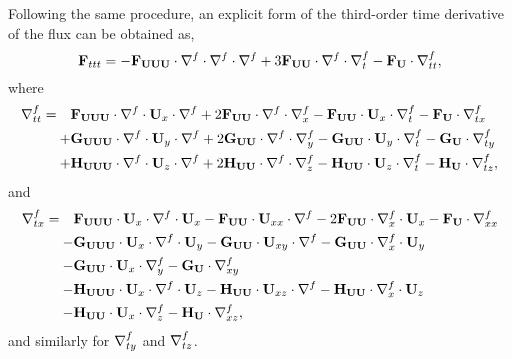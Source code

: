 Following the same procedure,
an explicit form of the third-order time derivative of the flux
can be obtained as,
\begin{equation}\label{eq:pif_Fttt}
    \bF_{ttt} = -\bF_{\bU \bU \bU} \cdot \Div \cdot \Div \cdot \Div
    + 3 \bF_{\bU \bU} \cdot \Div \cdot \Div_{t}
    - \bF_{\bU} \cdot \Div_{tt},
\end{equation}
where
\begin{equation}\label{eq:pif_divtt}
    \begin{split}
        \Div_{tt} = \quad & \bF_{\bU \bU \bU} \cdot \Div \cdot \bU_{x} \cdot \Div + 2 \bF_{\bU \bU} \cdot \Div \cdot \Div_{x} - \bF_{\bU \bU} \cdot \bU_{x} \cdot \Div_{t} - \bF_{\bU} \cdot \Div_{tx} \\
            + & \bG_{\bU \bU \bU} \cdot \Div \cdot \bU_{y} \cdot \Div + 2 \bG_{\bU \bU} \cdot \Div \cdot \Div_{y} - \bG_{\bU \bU} \cdot \bU_{y} \cdot \Div_{t} - \bG_{\bU} \cdot \Div_{ty} \\
            + & \bH_{\bU \bU \bU} \cdot \Div \cdot \bU_{z} \cdot \Div + 2 \bH_{\bU \bU} \cdot \Div \cdot \Div_{z} - \bH_{\bU \bU} \cdot \bU_{z} \cdot \Div_{t} - \bH_{\bU} \cdot \Div_{tz},
    \end{split}
\end{equation}
and
\begin{equation}\label{eq:pif_divtx}
    \begin{split}
        \Div_{tx} = \quad & \bF_{\bU \bU \bU} \cdot \bU_{x} \cdot \Div \cdot \bU_{x} - \bF_{\bU \bU} \cdot \bU_{xx} \cdot \Div
        -2\bF_{\bU \bU} \cdot \Div_{x} \cdot \bU_{x} - \bF_{\bU} \cdot \Div_{xx} \\
            - & \bG_{\bU \bU \bU} \cdot \bU_{x} \cdot \Div \cdot \bU_{y} - \bG_{\bU \bU} \cdot \bU_{xy} \cdot \Div - \bG_{\bU \bU} \cdot \Div_{x} \cdot \bU_{y} \\
            - & \bG_{\bU \bU} \cdot \bU_{x} \cdot \Div_{y} - \bG_{\bU} \cdot \Div_{xy} \\
            - & \bH_{\bU \bU \bU} \cdot \bU_{x} \cdot \Div \cdot \bU_{z} - \bH_{\bU \bU} \cdot \bU_{xz} \cdot \Div - \bH_{\bU \bU} \cdot \Div_{x} \cdot \bU_{z} \\
            - & \bH_{\bU \bU} \cdot \bU_{x} \cdot \Div_{z} - \bH_{\bU} \cdot \Div_{xz},
    \end{split}
\end{equation}
and similarly for \( \Div_{ty} \) and \( \Div_{tz} \).


